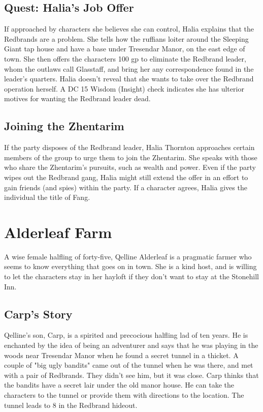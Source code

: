 \documentclass[10pt,a4paper,twoside,bg=print,twocolumn,openany,nodeprecatedcode]{dndbook}
\begin{document}
\subsection{Quest: Halia's Job Offer}
If approached by characters she believes she can control, Halia explains that the Redbrands are a problem. She tells how the ruffians loiter around the Sleeping Giant tap house and have a base under Tresendar Manor, on the east edge of town. She then offers the characters 100 gp to eliminate the Redbrand leader, whom the outlaws call Glasstaff, and bring her any correspondence found in the leader's quarters. Halia doesn't reveal that she wants to take over the Redbrand operation herself. A DC 15 Wisdom (Insight) check indicates she has ulterior motives for wanting the Redbrand leader dead.

\subsection{Joining the Zhentarim}
If the party disposes of the Redbrand leader, Halia Thornton approaches certain members of the group to urge them to join the Zhentarim. She speaks with those who share the Zhentarim's pursuits, such as wealth and power. Even if the party wipes out the Redbrand gang, Halia might still extend the offer in an effort to gain friends (and spies) within the party. If a character agrees, Halia gives the individual the title of Fang.

\section{Alderleaf Farm}
A wise female halfling of forty-five, Qelline Alderleaf is a pragmatic farmer who seems to know everything that goes on in town. She is a kind host, and is willing to let the characters stay in her hayloft if they don't want to stay at the Stonehill Inn.

\subsection{Carp's Story}
Qelline's son, Carp, is a spirited and precocious halfling lad of ten years. He is enchanted by the idea of being an adventurer and says that he was playing in the woods near Tresendar Manor when he found a secret tunnel in a thicket. A couple of "big ugly bandits" came out of the tunnel when he was there, and met with a pair of Redbrands. They didn't see him, but it was close. Carp thinks that the bandits have a secret lair under the old manor house. He can take the characters to the tunnel or provide them with directions to the location. The tunnel leads to 8 in the Redbrand hideout.
\end{document}
